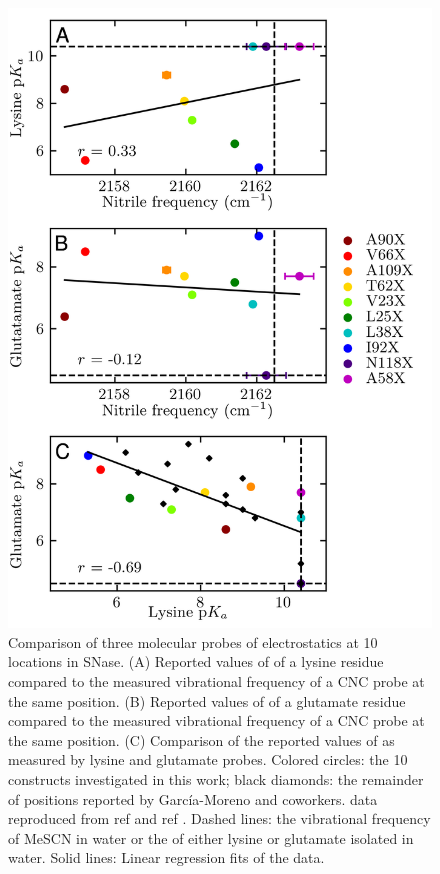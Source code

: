 \begin{figure}
    \center
    \includegraphics[width=\single]{figures-snase/pKa_vs_peak.png}
    \caption[Comparison of three molecular probes of electrostatics at 10 locations in SNase]{
        Comparison of three molecular probes of electrostatics at 10 locations in SNase. 
        (A) Reported values of \pKa{} of a lysine residue compared to the measured vibrational frequency of a CNC probe at the same position. 
        (B) Reported values of \pKa{} of a glutamate residue compared to the measured vibrational frequency of a CNC probe at the same position. 
        (C) Comparison of the reported values of \pKa{} as measured by lysine and glutamate \pKa{} probes. 
        Colored circles: the 10 constructs investigated in this work; 
        black diamonds: the remainder of positions reported by Garc\'ia-Moreno and coworkers. 
        \pKa{} data reproduced from ref  and ref . 
        Dashed lines: the vibrational frequency of MeSCN in water or the \pKa{} of either lysine or glutamate isolated in water. 
        Solid lines: Linear regression fits of the data.
    }
    \label{fig:snase-pKas_vs_peak}
\end{figure}

